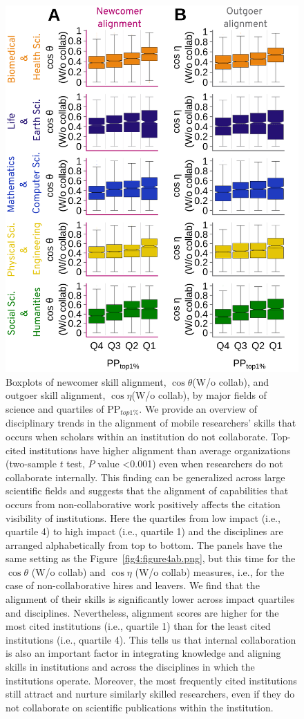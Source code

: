 \documentclass[draft,final]{vutinfth} %
\begin{document}
\begin{figure} [!ht]
\centering
  \includegraphics[width=0.5\linewidth]{figures_alignment/figure8ab.png}
\caption{Boxplots of newcomer skill alignment, $\cos{\theta}$(W/o collab), and outgoer skill alignment, $\cos{\eta}$(W/o collab), by major fields of science and quartiles of PP$_{top1\%}$. We provide an overview of disciplinary trends in the alignment of mobile researchers' skills that occurs when scholars within an institution do not collaborate.
Top-cited institutions have higher alignment than average organizations (two-sample $t$ test, $P$ value <0.001) even when researchers do not collaborate internally. This finding can be generalized across large scientific fields and suggests that the alignment of capabilities that occurs from non-collaborative work positively affects the citation visibility of institutions. Here the quartiles from low impact (i.e., quartile 4) to high impact (i.e., quartile 1) and the disciplines are arranged alphabetically from top to bottom. The panels have the same setting as the Figure~\ref{fig4:figure4ab.png}, but this time for the $\cos\theta$ (W/o collab) and $\cos\eta$ (W/o collab) measures, i.e., for the case of non-collaborative hires and leavers. We find that the alignment of their skills is significantly lower across impact quartiles and disciplines. Nevertheless, alignment scores are higher for the most cited institutions (i.e., quartile 1) than for the least cited institutions (i.e., quartile 4). This tells us that internal collaboration is also an important factor in integrating knowledge and aligning skills in institutions and across the disciplines in which the institutions operate. Moreover, the most frequently cited institutions still attract and nurture similarly skilled researchers, even if they do not collaborate on scientific publications within the institution. 
}
\label{SI:figure8ab.png}
\end{figure}
\end{document}
